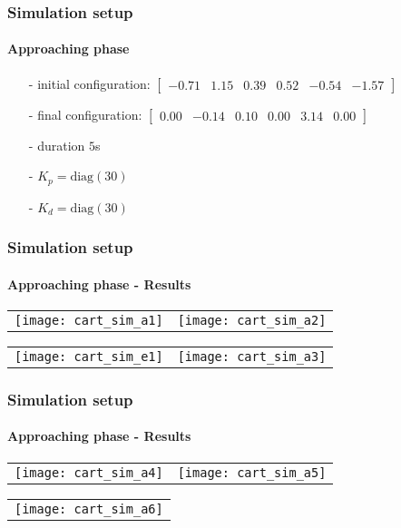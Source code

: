 \begin{frame}
  \frametitle{Simulation setup}
  \framesubtitle{Approaching phase}
  \begin{itemize}
  \item[-] initial configuration: $\begin{bmatrix} -0.71 & 1.15 & 0.39 & 0.52 & -0.54 & -1.57 \end{bmatrix}$
  \item[-] final configuration: $\begin{bmatrix} 0.00 & -0.14 & 0.10 & 0.00 & 3.14 & 0.00 \end{bmatrix}$
  \item[-] duration $5$s
  \item[-] $K_p = \mathrm{diag}(30)$
  \item[-] $K_d = \mathrm{diag}(30)$
  \end{itemize}
\end{frame}

\begin{frame}
  \frametitle{Simulation setup}
  \framesubtitle{Approaching phase - Results}
  \begin{center}
   \vskip-0.1in
    \begin{tabular}{cc}
      \texttt{[image: cart\_sim\_a1]} &
      \texttt{[image: cart\_sim\_a2]}
    \end{tabular}
  \end{center}
  \begin{center}
   \vskip-0.1in
    \begin{tabular}{cc}
      \texttt{[image: cart\_sim\_e1]} &
      \texttt{[image: cart\_sim\_a3]}
    \end{tabular}
  \end{center}
\end{frame}

\begin{frame}
  \frametitle{Simulation setup}
  \framesubtitle{Approaching phase - Results}
  \begin{center}
   \vskip-0.1in
    \begin{tabular}{cc}
      \texttt{[image: cart\_sim\_a4]} &
      \texttt{[image: cart\_sim\_a5]}
    \end{tabular}
  \end{center}
  \begin{center}
   \vskip-0.1in
    \begin{tabular}{c}
      \texttt{[image: cart\_sim\_a6]}
    \end{tabular}
  \end{center}
\end{frame}

